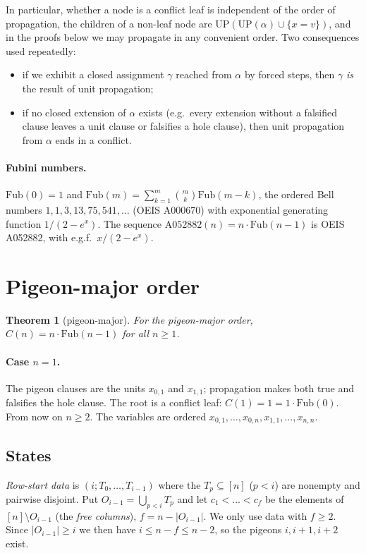 \documentclass[11pt]{article}
\newtheorem{theorem}{Theorem}
\theoremstyle{definition}
\theoremstyle{remark}
\newcommand{\Fub}{\mathrm{Fub}}
\newcommand{\UP}{\mathrm{UP}}
\begin{document}
In particular, whether a node is a conflict leaf is independent of the order of propagation, the
children of a non-leaf node are $\UP(\UP(\alpha)\cup\{x{=}v\})$, and in the proofs below we may
propagate in any convenient order. Two consequences used repeatedly:
\begin{itemize}
\item[(U-i)] if we exhibit a closed assignment $\gamma$ reached from $\alpha$ by forced steps, then
  $\gamma$ \emph{is} the result of unit propagation;
\item[(U-ii)] if no closed extension of $\alpha$ exists (e.g.\ every extension without a falsified
  clause leaves a unit clause or falsifies a hole clause), then unit propagation from $\alpha$ ends in
  a conflict.
\end{itemize}

\paragraph{Fubini numbers.} $\Fub(0)=1$ and $\Fub(m)=\sum_{k=1}^m\binom mk\Fub(m-k)$, the ordered Bell
numbers $1,1,3,13,75,541,\dots$ (OEIS A000670) with exponential generating function $1/(2-e^x)$.
The sequence $\mathrm{A052882}(n)=n\cdot\Fub(n-1)$ is OEIS A052882, with e.g.f.\ $x/(2-e^x)$.

\section{Pigeon-major order}\label{sec:pig}

\begin{theorem}[pigeon-major]\label{thm:pig}
For the pigeon-major order, $C(n)=n\cdot\Fub(n-1)$ for all $n\ge1$.
\end{theorem}

\paragraph{Case $n=1$.} The pigeon clauses are the units $x_{0,1}$ and $x_{1,1}$; propagation makes both
true and falsifies the hole clause. The root is a conflict leaf: $C(1)=1=1\cdot\Fub(0)$. From now on
$n\ge2$. The variables are ordered $x_{0,1},\dots,x_{0,n},x_{1,1},\dots,x_{n,n}$.

\subsection{States}
\emph{Row-start data} is $(i;T_0,\dots,T_{i-1})$ where the $T_p\subseteq[n]$ ($p<i$) are nonempty and
pairwise disjoint. Put $O_{i-1}=\bigcup_{p<i}T_p$ and let $c_1<\dots<c_f$ be the elements of
$[n]\setminus O_{i-1}$ (the \emph{free columns}), $f=n-|O_{i-1}|$. We only use data with $f\ge2$.
Since $|O_{i-1}|\ge i$ we then have $i\le n-f\le n-2$, so the pigeons $i,i+1,i+2$ exist.
\end{document}
